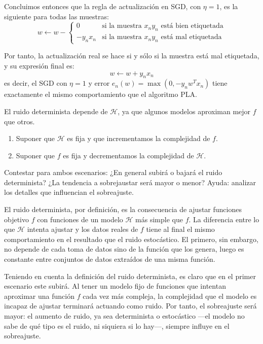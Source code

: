 \documentclass[a4paper, 11pt]{article}
\begin{document}
\begin{solucion}
        Concluimos entonces que la regla de actualización en SGD, con $\eta = 1$, es la siguiente para todas las muestras:
        \[
        w \gets w - \begin{cases}
            0 &\textrm{si la muestra } x_n y_n \textrm{ está bien etiquetada} \\
            -y_n x_n &\textrm{si la muestra } x_n y_n \textrm{ está mal etiquetada}
        \end{cases}
        \]

        Por tanto, la actualización real se hace si y sólo si la muestra está mal etiquetada, y su expresión final es:
        \[
        w \gets w + y_nx_n
        \]
        es decir, el SGD con $\eta = 1$ y error $e_n(w)=\max(0,-y_nw^Tx_n)$ tiene exactamente el mismo comportamiento que el algoritmo PLA.
      \end{solucion}

      \begin{ejercicio}
        El ruido determinista depende de $\mathcal{H}$, ya que algunos modelos aproximan mejor $f$ que otros.
        \begin{enumerate}
            \item Suponer que $\mathcal{H}$ es fija y que incrementamos la complejidad de $f$.
            \item Suponer que $f$ es fija y decrementamos la complejidad de $\mathcal{H}$.
        \end{enumerate}
        Contestar para ambos escenarios: ¿En general subirá o bajará el ruido determinista? ¿La tendencia a sobrejaustar será mayor o menor? Ayuda: analizar los detalles que influencian el sobreajuste.
      \end{ejercicio}

      \begin{solucion}
        El ruido determinista, por definición, es la consecuencia de ajustar funciones objetivo $f$ con funciones de un modelo $\mathcal{H}$ más simple que $f$. La diferencia entre lo que $\mathcal{H}$ intenta ajustar y los datos reales de $f$ tiene al final el mismo comportamiento en el resultado que el ruido estocástico. El primero, sin embargo, no depende de cada toma de datos sino de la función que los genera, luego es constante entre conjuntos de datos extraídos de una misma función.

        Teniendo en cuenta la definición del ruido determinista, es claro que en el primer escenario este subirá. Al tener un modelo fijo de funciones que intentan aproximar una función $f$ cada vez más compleja, la complejidad que el modelo es incapaz de ajustar terminará actuando como ruido. Por tanto, el sobreajuste será mayor: el aumento de ruido, ya sea determinista o estocástico ---el modelo no sabe de qué tipo es el ruido, ni siquiera si lo hay---, siempre influye en el sobreajuste.


      \end{solucion}
\end{document}
